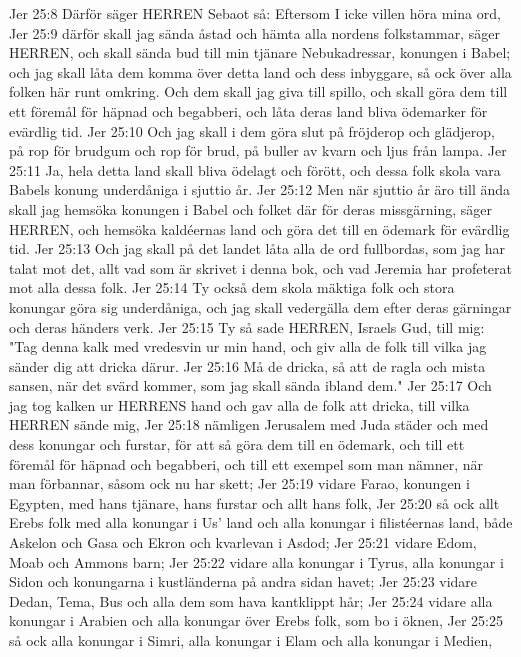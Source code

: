 Jer 25:8  Därför säger HERREN Sebaot så: Eftersom I icke villen höra mina ord,
Jer 25:9  därför skall jag sända åstad och hämta alla nordens folkstammar, säger HERREN, och skall sända bud till min tjänare Nebukadressar, konungen i Babel; och jag skall låta dem komma över detta land och dess inbyggare, så ock över alla folken här runt omkring. Och dem skall jag giva till spillo, och skall göra dem till ett föremål för häpnad och begabberi, och låta deras land bliva ödemarker för evärdlig tid.
Jer 25:10  Och jag skall i dem göra slut på fröjderop och glädjerop, på rop för brudgum och rop för brud, på buller av kvarn och ljus från lampa.
Jer 25:11  Ja, hela detta land skall bliva ödelagt och förött, och dessa folk skola vara Babels konung underdåniga i sjuttio år.
Jer 25:12  Men när sjuttio år äro till ända skall jag hemsöka konungen i Babel och folket där för deras missgärning, säger HERREN, och hemsöka kaldéernas land och göra det till en ödemark för evärdlig tid.
Jer 25:13  Och jag skall på det landet låta alla de ord fullbordas, som jag har talat mot det, allt vad som är skrivet i denna bok, och vad Jeremia har profeterat mot alla dessa folk.
Jer 25:14  Ty också dem skola mäktiga folk och stora konungar göra sig underdåniga, och jag skall vedergälla dem efter deras gärningar och deras händers verk.
Jer 25:15  Ty så sade HERREN, Israels Gud, till mig: "Tag denna kalk med vredesvin ur min hand, och giv alla de folk till vilka jag sänder dig att dricka därur.
Jer 25:16  Må de dricka, så att de ragla och mista sansen, när det svärd kommer, som jag skall sända ibland dem."
Jer 25:17  Och jag tog kalken ur HERRENS hand och gav alla de folk att dricka, till vilka HERREN sände mig,
Jer 25:18  nämligen Jerusalem med Juda städer och med dess konungar och furstar, för att så göra dem till en ödemark, och till ett föremål för häpnad och begabberi, och till ett exempel som man nämner, när man förbannar, såsom ock nu har skett;
Jer 25:19  vidare Farao, konungen i Egypten, med hans tjänare, hans furstar och allt hans folk,
Jer 25:20  så ock allt Erebs folk med alla konungar i Us' land och alla konungar i filistéernas land, både Askelon och Gasa och Ekron och kvarlevan i Asdod;
Jer 25:21  vidare Edom, Moab och Ammons barn;
Jer 25:22  vidare alla konungar i Tyrus, alla konungar i Sidon och konungarna i kustländerna på andra sidan havet;
Jer 25:23  vidare Dedan, Tema, Bus och alla dem som hava kantklippt hår;
Jer 25:24  vidare alla konungar i Arabien och alla konungar över Erebs folk, som bo i öknen,
Jer 25:25  så ock alla konungar i Simri, alla konungar i Elam och alla konungar i Medien,

